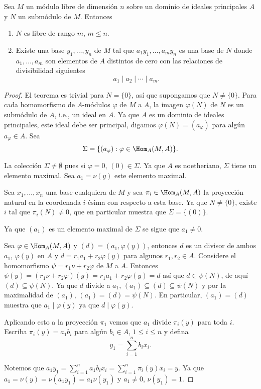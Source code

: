 \begin{theorem}
  Sea $M$ un módulo libre de dimensión $n$ sobre un dominio de ideales principales $A$ y $N$ un submódulo de $M$. Entonces
  \begin{enumerate}
    \item $N$ es libre de rango $m$, $m \leq n$.
    \item Existe una base $y_1,\ldots,y_n$ de $M$ tal que $a_1y_1,\ldots,a_m y_n$ es una base de $N$ donde $a_1,\ldots,a_m$ son elementos de $A$ distintos de cero con las relaciones de divisibilidad siguientes
      \[
        a_1 \mid a_2 \mid \cdots \mid a_m.
      \]
  \end{enumerate}
\end{theorem}
\begin{proof}
  El teorema es trivial para $N = \{0\}$, así que supongamos que $N \neq \{0\}$. Para cada homomorfismo de $A$-módulos $\varphi$ de $M$ a $A$, la imagen $\varphi(N)$ de $N$ es un submódulo de $A$, i.e., un ideal en $A$. Ya que $A$ es un dominio de ideales principales, este ideal debe ser principal, digamos $\varphi(N) = (a_\varphi)$ para algún $a_\varphi \in A$. Sea
  \[
    \Sigma = \{ (a_\varphi) : \varphi \in \Hom_A(M,A) \}.
  \]

  La colección $\Sigma \neq \emptyset$ pues si $\varphi = 0$, $(0) \in \Sigma$. Ya que $A$ es noetheriano, $\Sigma$ tiene un elemento maximal. Sea $a_1 = \nu(y)$ este elemento maximal.

  Sea $x_1,\ldots,x_n$ una base cualquiera de $M$ y sea $\pi_i \in \Hom_A(M,A)$ la proyección natural en la coordenada $i$-ésima con respecto a esta base. Ya que $N \neq \{0\}$, existe $i$ tal que $\pi_i(N) \neq 0$, que en particular muestra que $\Sigma = \{ (0)\}$.

  Ya que $(a_1)$ es un elemento maximal de $\Sigma$ se sigue que $a_1 \neq 0$.

  Sea $\varphi \in \Hom_A(M,A)$ y $(d) = (a_1, \varphi(y))$, entonces $d$ es un divisor de ambos $a_1$, $\varphi(y)$ en $A$ y $d = r_1 a_1 + r_2 \varphi(y)$ para algunos $r_1, r_2 \in A$. Considere el homomorfismo $\psi = r_1 \nu + r_2 \varphi$ de $M$ a $A$. Entonces $\psi(y) = (r_1 \nu + r_2 \varphi)(y) = r_1a_1 + r_2 \varphi(y) = d$ así que $d \in \psi(N)$, de aquí $(d) \subseteq \psi(N)$. Ya que $d$ divide a $a_1$, $(a_1) \subseteq (d) \subseteq \psi(N)$ y por la maximalidad de $(a_1)$, $(a_1) = (d) = \psi(N)$. En particular, $(a_1) = (d)$ muestra que $a_1 \mid \varphi(y)$ ya que $d \mid \varphi(y)$.

  Aplicando esto a la proyección $\pi_1$ vemos que $a_1$ divide $\pi_i(y)$ para toda $i$. Escriba $\pi_i(y) = a_1 b_i$ para algún $b_i \in A$, $1 \leq i \leq n$ y defina
  \[
    y_1 = \sum_{i=1}^n b_i x_i.
  \]

  Notemos que $a_1 y_1 = \sum_{i=1}^n a_1 b_i x_i = \sum_{i=1}^n \pi_i (y) x_i = y$. Ya que $a_1 = \nu(y) = \nu(a_1 y_1) = a_1 \nu(y_1)$ y $a_1 \neq 0$, $\nu(y_1) = 1$.
\end{proof}
